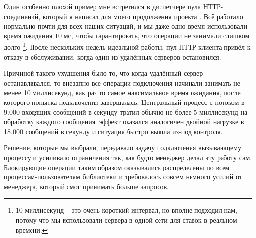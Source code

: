 \documentclass[11pt, oneside]{book}   	%
\begin{document}
Один особенно плохой пример мне встретился в диспетчере пула НТТР-соединений,  который я написал для моего продолжения проекта \href{https://github.com/ferd/lhttpc}{}. Всё работало нормально почти для всех наших ситуаций, и мы даже одно время использовали время ожидания 10 мс, чтобы гарантировать, что операции не занимали слишком долго \footnote{10 миллисекунд -- это очень короткий интервал, но вполне подходил нам, потому что мы использовали сервера в одной сети для ставок в реальном времени.}. После нескольких недель идеальной работы, пул НТТР-клиента привёл к отказу в обслуживании, когда один из удалённых серверов остановился.

Причиной такого ухудшения было то, что когда удалённый сервер останавливался, то внезапно все операции подключения начинали занимать не менее 10 миллисекунд, как раз то самое максимальное время ожидания, после которого попытка подключения завершалась. Центральный процесс с потоком в 9.000 входящих сообщений в секунду тратил обычно не более 5 миллисекунд на обработку каждого сообщения, эффект оказался аналогичен двойной нагрузке в 18.000 сообщений в секунду и ситуация быстро вышла из-под контроля.

Решение, которые мы выбрали, передавало задачу подключения вызывающему процессу и усиливало ограничения так, как будто менеджер делал эту работу сам. Блокирующие операции таким образом оказывались распределены по всем процессам-пользователям библиотеки и требовалось совсем немного усилий от менеджера, который смог принимать больше запросов.
\end{document}
